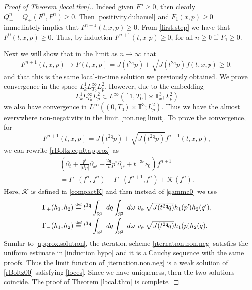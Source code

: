 \documentclass[reqno]{amsart}
\newcommand{\eqdef }{\overset{\mbox{\tiny{def}}}{=}}
\newcommand{\pv}{p}
\newcommand{\qv}{q}
\newcommand{\qq}{\mathfrak{q}}
\newcommand{\tqq}{t^{2\qq}}
\newcommand{\compK}{\mathcal{K}}
\newcommand{\Emptyset}{\text{\o}}
\newcommand{\T}{\mathbb{T}}
\theoremstyle{definition}
\numberwithin{equation}{section}
\numberwithin{theorem}{section}
\begin{document}
\begin{proof}[Proof of Theorem \ref{local.thm}.]
Indeed given $F^{n} \ge 0$, then clearly $Q_+^{n} = Q_+(F^{n},F^{n})\geq 0$.  Then \eqref{positivity.duhamel} and $F_1(x,\pv)\geq 0$ immediately implies that $F^{n+1}(t,x,\pv) \geq 0$. From \eqref{first.step} we have that $ F^{0}(t,x,\pv) \geq 0$.  Thus, by induction  $F^{n+1}(t,x,\pv)  \ge 0$, for all $n\ge 0$ if $F_1\ge 0$.  

Next we will show that in the limit as $n\to\infty$ that 
\begin{equation}\label{non.neg.limit}
    F^{n+1}(t,x,\pv) \to F(t,x,p)= J(\tqq \pv) + \sqrt{J(\tqq \pv)} f(t,x,p)\ge 0,
\end{equation}
and that this is the same local-in-time solution we previously obtained. We prove convergence in the space $L^1_{{k}}L^\infty_{T_0}L^2_\pv$. However, due to the embedding
$$
L^1_{{k}}L^\infty_{T_0}L^2_\pv\subset L^\infty([1,T_0]\times\T^3_x;L^2_\pv)
$$
we also have convergence in $L^\infty((0,T_0)\times\T^3;L^2_\pv)$. Thus we have the almost everywhere non-negativity in the limit \eqref{non.neg.limit}.  To prove the convergence, for 
\begin{equation*}
    F^{n+1}(t,x,\pv) = J(\tqq \pv) + \sqrt{J(\tqq\pv)} f^{n+1}(t,x,\pv),
\end{equation*}
we can rewrite \eqref{rBoltz.eqn0.approx} as
\begin{multline}\label{iternation.non.neg}
       \left( \partial_t +\frac{\pv^i}{|t^\qq\pv|} \partial_{x^i} 
    - \frac{2 \qq}{t} p^i \partial_{p^i} + t^{-3\qq} \nu_0\right) f^{n+1} 
    \\
    =
    \Gamma_+(f^{n},f^{n})
    -
    \Gamma_-(f^{n+1},f^{n})
    +
\compK (f^{n}).  
\end{multline}
Here, $\compK$ is defined in \eqref{compactK} and then instead of \eqref{gamma0} we use 
\begin{align*}
\Gamma_+ (h_1,h_2)
&\eqdef
t^{3\qq}\int_{\mathbb{R}^3} ~  dq 
\int_{\mathbb{S}^{2}} ~ d\omega
~ v_{\Emptyset} ~  
 \sqrt{J(\tqq\qv)}
 h_1(p^{\prime })h_2(q^{\prime}),
\\
\Gamma_- (h_1,h_2)
&\eqdef
t^{3\qq}\int_{\mathbb{R}^3} ~  dq 
\int_{\mathbb{S}^{2}} ~ d\omega
~ v_{\Emptyset} ~  
 \sqrt{J(\tqq\qv)}
h_1(p)h_2(q).
\end{align*}
Similar to \eqref{approx.solution}, 
the iteration scheme \eqref{iternation.non.neg} satisfies the uniform estimate in \eqref{induction hypo}  and it is  a Cauchy sequence with the same proofs.  Thus the limit function of \eqref{iternation.non.neg} is  a weak solution of  \eqref{rBoltz00} satisfying  \eqref{loces}.  Since we have uniqueness, then the two solutions coincide.  The proof of Theorem \ref{local.thm} is complete. 
\end{proof}
\end{document}
